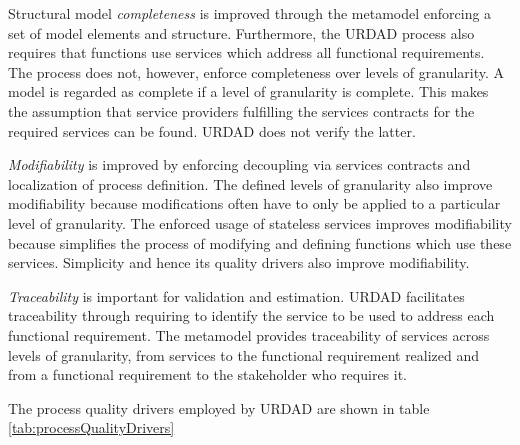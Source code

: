 Structural model \emph{completeness} is improved through the metamodel enforcing a set of model elements and structure. Furthermore, the URDAD process also requires that functions use services which address all functional requirements. The process does not, however, enforce completeness over levels of granularity. A model is regarded as complete if a level of granularity is complete. This makes the assumption that service providers fulfilling the services contracts for the required services can be found. URDAD does not verify the latter.

\emph{Modifiability} is improved by enforcing decoupling via services contracts and localization of process definition. The defined levels of granularity also improve modifiability because modifications often have to only be applied to a particular level of granularity. The enforced usage of stateless services improves modifiability because simplifies the process of modifying and defining functions which use these services. Simplicity and hence its quality drivers also improve modifiability.

\emph{Traceability} is important for validation and estimation. URDAD facilitates traceability through requiring to identify the service to be used to address each functional requirement. The metamodel provides traceability of services across levels of granularity,  from services to the functional requirement realized and from a functional requirement to the stakeholder who requires it.

The process quality drivers employed by URDAD are shown in table \ref{tab:processQualityDrivers}

